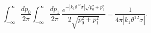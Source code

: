 \begin{equation}
  \int_{-\infty}^{\infty} \frac{d p_0}{2 \pi}
  \int_{-\infty}^{\infty} \frac{d p_1}{2 \pi}~
  \frac{e^{- | k_1 \theta^{12} \sigma | \sqrt{p_0^2+p_1^2}}}
       {2 \sqrt{p_0^2+p_1^2}}
  = \frac{1}{4 \pi | k_1 \theta^{12} \sigma |}.
\end{equation}

